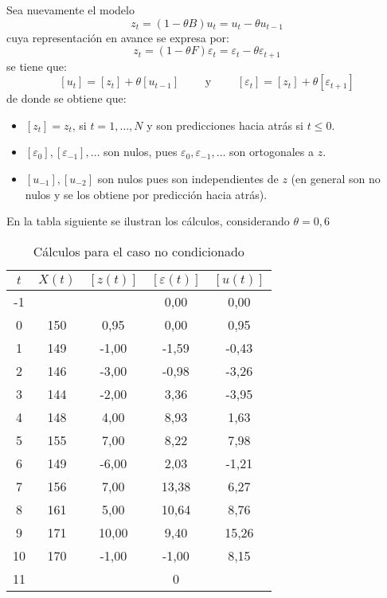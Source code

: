 \begin{ejemplo}
Sea nuevamente el modelo
\[
z_{t} =\left( {1-\theta B} \right)u_{t} =u_{t} -\theta u_{t-1} 
\]
cuya representaci\'{o}n en avance se expresa por:
\[
z_{t} =\left( {1-\theta F} \right)\varepsilon_{t} =\varepsilon_{t} -\theta \varepsilon_{t+1}
\]
se tiene que:
\[
\left[ {u_{t} } \right]=\left[ {z_{t} } \right]+\theta \left[ {u_{t-1} } \right]\qquad \text{ y }\qquad \left[ {\varepsilon_{t} } \right]=\left[ {z_{t}} \right]+\theta \left[ {\varepsilon_{t+1} } \right]
\]
de donde se obtiene que:
\begin{itemize}
\item $\left[ {z_{t} } \right]=z_{t}$, si $t=1,\ldots,N$ y son predicciones hacia atr\'{a}s si $t\leq 0$.

\item $\left[ {\varepsilon_{0} } \right],\left[ {\varepsilon_{-1} } \right],\ldots $ son nulos, pues $\varepsilon_{0} ,\varepsilon_{-1} ,\ldots $ son ortogonales a $z$.

\item $\left[ {u_{-1} } \right],\left[ {u_{-2} } \right]$ son nulos pues son independientes de $z$ (en general son no nulos y se los obtiene por predicci\'{o}n hacia atr\'{a}s).
\end{itemize}

En la tabla siguiente se ilustran los c\'{a}lculos, considerando $\theta =0,6$

\begin{table}[H]
\centering
\begin{tabular}{@{}ccccc@{}}
\toprule
$t$& $X(t)$& $[z(t)]$& $[\varepsilon(t)]$& $[u(t)]$ \\
\midrule
-1&  &  & 0,00& 0,00 \\
0& 150& 0,95& 0,00& 0,95 \\
1& 149& -1,00& -1,59& -0,43 \\
2& 146& -3,00& -0,98& -3,26 \\
3& 144& -2,00& 3,36& -3,95 \\
4& 148& 4,00& 8,93& 1,63 \\
5& 155& 7,00& 8,22& 7,98 \\
6& 149& -6,00& 2,03& -1,21 \\
7& 156& 7,00& 13,38& 6,27 \\
8& 161& 5,00& 10,64& 8,76 \\
9& 171& 10,00& 9,40& 15,26 \\
10& 170& -1,00& -1,00& 8,15 \\
11& & & 0&  \\
\bottomrule
\end{tabular}
\caption{C\'{a}lculos para el caso no condicionado}
\end{table}


\end{ejemplo}
